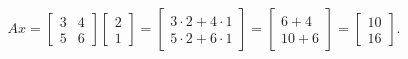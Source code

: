 \documentclass[preview]{standalone}
\begin{document}
\begin{align*}
A x = \begin{bmatrix} 3 & 4 \\ 5 & 6 \end{bmatrix} \begin{bmatrix} 2 \\ 1 \end{bmatrix}= \begin{bmatrix} 3\cdot 2 + 4\cdot 1 \\ 5\cdot 2 + 6\cdot 1 \end{bmatrix}= \begin{bmatrix} 6 + 4 \\ 10 + 6 \end{bmatrix}= \begin{bmatrix} 10 \\ 16 \end{bmatrix}.
\end{align*}
\end{document}
